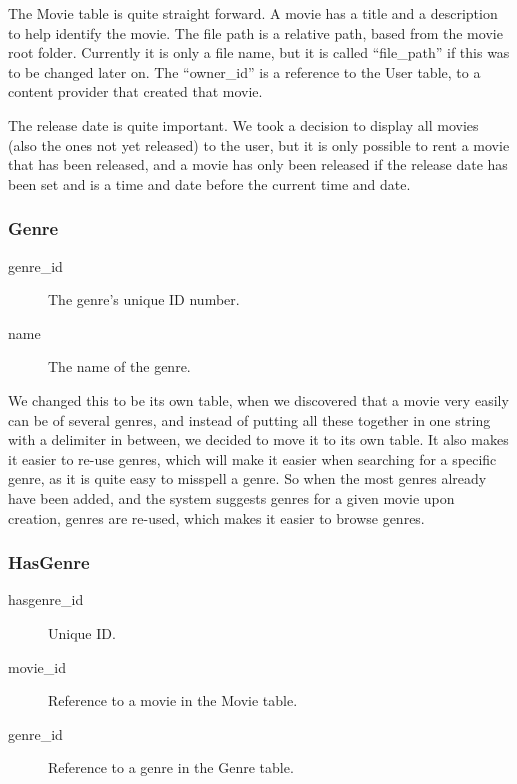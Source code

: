 The Movie table is quite straight forward. A movie has a title and a description to help identify the movie. The file path is a relative path, based from the movie root folder. Currently it is only a file name, but it is called ``file\_path'' if this was to be changed later on. The ``owner\_id'' is a reference to the User table, to a content provider that created that movie.

The release date is quite important. We took a decision to display all movies (also the ones not yet released) to the user, but it is only possible to rent a movie that has been released, and a movie has only been released if the release date has been set and is a time and date before the current time and date.

\subsubsection{Genre}
\label{Design_Database_Tables_Genre}

\begin{description}
\item[genre\_id] The genre's unique ID number.
\item[name] The name of the genre.
\end{description}

We changed this to be its own table, when we discovered that a movie very easily can be of several genres, and instead of putting all these together in one string with a delimiter in between, we decided to move it to its own table. It also makes it easier to re-use genres, which will make it easier when searching for a specific genre, as it is quite easy to misspell a genre. So when the most genres already have been added, and the system suggests genres for a given movie upon creation, genres are re-used, which makes it easier to browse genres.

\subsubsection{HasGenre}
\label{Design_Database_Tables_HasGenre}

\begin{description}
\item[hasgenre\_id] Unique ID.
\item[movie\_id] Reference to a movie in the Movie table.
\item[genre\_id] Reference to a genre in the Genre table.
\end{description}

